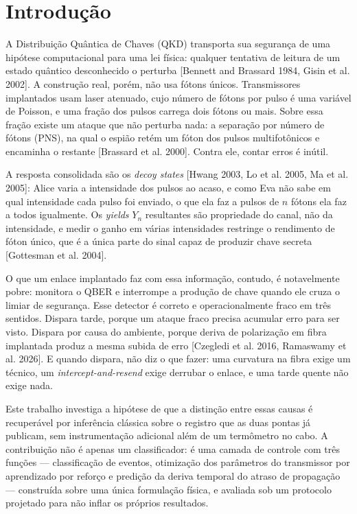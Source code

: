\documentclass[12pt]{article}
\begin{document}
\vspace{1.0em}

\section{Introdução}
\label{sec:intro}

A Distribuição Quântica de Chaves (QKD) transporta sua segurança de uma hipótese
computacional para uma lei física: qualquer tentativa de leitura de um estado
quântico desconhecido o perturba [Bennett and Brassard 1984, Gisin et al. 2002].
A construção real, porém, não usa fótons únicos. Transmissores implantados usam
laser atenuado, cujo número de fótons por pulso é uma variável de Poisson, e uma
fração dos pulsos carrega dois fótons ou mais. Sobre essa fração existe um ataque
que não perturba nada: a separação por número de fótons (PNS), na qual o
espião retém um fóton dos pulsos multifotônicos e encaminha o restante
[Brassard et al. 2000]. Contra ele, contar erros é inútil.

A resposta consolidada são os \emph{decoy states} [Hwang 2003, Lo et al. 2005,
Ma et al. 2005]: Alice varia a intensidade dos pulsos ao acaso, e como Eva não
sabe em qual intensidade cada pulso foi enviado, o que ela faz a pulsos de $n$
fótons ela faz a todos igualmente. Os \emph{yields} $Y_n$ resultantes são
propriedade do canal, não da intensidade, e medir o ganho em várias intensidades
restringe o rendimento de fóton único, que é a única parte do sinal capaz de
produzir chave secreta [Gottesman et al. 2004].

O que um enlace implantado faz com essa informação, contudo, é notavelmente
pobre: monitora o QBER e interrompe a produção de chave quando ele cruza o limiar
de segurança. Esse detector é correto e operacionalmente fraco em três sentidos.
Dispara tarde, porque um ataque fraco precisa acumular erro para ser visto.
Dispara por causa do ambiente, porque deriva de polarização em fibra implantada
produz a mesma subida de erro [Czegledi et al. 2016, Ramaswamy et al. 2026]. E
quando dispara, não diz o que fazer: uma curvatura na fibra exige um técnico, um
\emph{intercept-and-resend} exige derrubar o enlace, e uma tarde quente não exige
nada.

Este trabalho investiga a hipótese de que a distinção entre essas causas é
recuperável por inferência clássica sobre o registro que as duas pontas já
publicam, sem instrumentação adicional além de um termômetro no cabo. A
contribuição não é apenas um classificador: é uma camada de controle com três
funções --- classificação de eventos, otimização dos parâmetros do transmissor
por aprendizado por reforço e predição da deriva temporal do atraso de propagação
--- construída sobre uma única formulação física, e avaliada sob um protocolo
projetado para não inflar os próprios resultados.
\end{document}
